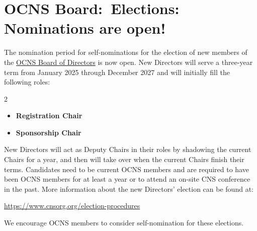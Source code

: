 \section*{OCNS Board:\ Elections: Nominations are open!}%
%

The nomination period for self-nominations for the election of new members of the \href{https://www.cnsorg.org/board-of-directors}{OCNS Board of Directors} is now open.
New Directors will serve a three-year term from January 2025 through December 2027 and will initially fill the following roles:
\begin{multicols}{2}
  \begin{itemize}
    \item \textbf{Registration Chair}
    \item \textbf{Sponsorship Chair}
  \end{itemize}
\end{multicols}

New Directors will act as Deputy Chairs in their roles by shadowing the current Chairs for a year, and then will take over when the current Chairs finish their terms.
Candidates need to be current OCNS members and are required to have been OCNS members for at least a year or to attend an on-site CNS conference in the past.
More information about the new Directors' election can be found at:
\vspace{2ex}
\begin{center}
\url{https://www.cnsorg.org/election-procedures}
\end{center}
\vspace{2ex}

We encourage OCNS members to consider self-nomination for these elections.

